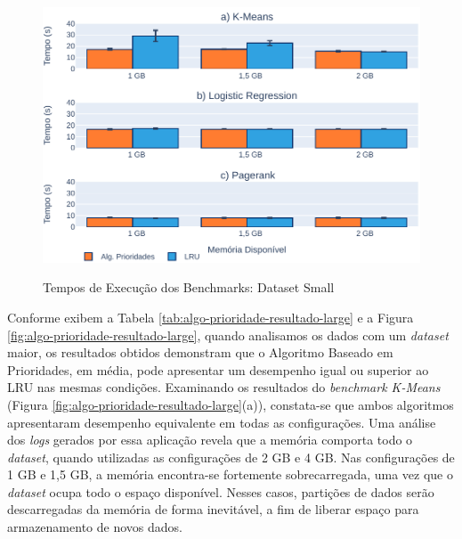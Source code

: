 \begin{figure}[!ht]
    \centering
    \caption{Tempos de Execução dos Benchmarks: Dataset Small}
    \includegraphics[scale=0.85]{imagens/resultados-dateset-small.pdf}
    \label{fig:algo-prioridade-resultado-small}
\end{figure}

Conforme exibem a Tabela \ref{tab:algo-prioridade-resultado-large} e a Figura \ref{fig:algo-prioridade-resultado-large}, quando analisamos os dados com um \textit{dataset} maior, os resultados obtidos demonstram que o Algoritmo Baseado em Prioridades, em média, pode apresentar um desempenho igual ou superior ao LRU nas mesmas condições. Examinando os resultados do \textit{benchmark K-Means} (Figura \ref{fig:algo-prioridade-resultado-large}(a)), constata-se que ambos algoritmos apresentaram desempenho equivalente em todas as configurações. Uma análise dos \textit{logs} gerados por essa aplicação revela que a memória comporta todo o \textit{dataset}, quando utilizadas as configurações de 2 GB e 4 GB. Nas configurações de 1 GB e 1,5 GB, a memória encontra-se fortemente sobrecarregada, uma vez que o \textit{dataset} ocupa todo o espaço disponível. Nesses casos, partições de dados serão descarregadas da memória de forma inevitável, a fim de liberar espaço para armazenamento de novos dados.


